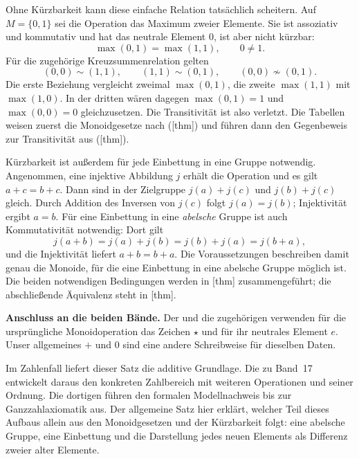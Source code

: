 Ohne Kürzbarkeit kann diese einfache Relation tatsächlich
scheitern. Auf \(M=\{0,1\}\) sei die Operation das Maximum
zweier Elemente. Sie ist assoziativ und kommutativ und hat
das neutrale Element \(0\), ist aber nicht kürzbar:
\[
  \max(0,1)=\max(1,1),\qquad 0\ne1.
\]
Für die zugehörige Kreuzsummenrelation gelten
\[
  (0,0)\sim(1,1),\qquad (1,1)\sim(0,1),
  \qquad (0,0)\not\sim(0,1).
\]
Die erste Beziehung vergleicht zweimal \(\max(0,1)\), die
zweite \(\max(1,1)\) mit \(\max(1,0)\). In der dritten
wären dagegen \(\max(0,1)=1\) und \(\max(0,0)=0\)
gleichzusetzen. Die Transitivität ist also verletzt.
Die Tabellen weisen zuerst die Monoidgesetze nach
([thm]) und führen dann
den Gegenbeweis zur Transitivität aus
([thm]).

Kürzbarkeit ist außerdem für jede Einbettung in eine Gruppe
notwendig. Angenommen, eine injektive Abbildung \(j\) erhält
die Operation und es gilt \(a+c=b+c\). Dann sind in der
Zielgruppe \(j(a)+j(c)\) und \(j(b)+j(c)\) gleich.
Durch Addition des Inversen von \(j(c)\) folgt
\(j(a)=j(b)\); Injektivität ergibt \(a=b\).
Für eine Einbettung in eine \emph{abelsche} Gruppe ist auch
Kommutativität notwendig: Dort gilt
\[
  j(a+b)=j(a)+j(b)=j(b)+j(a)=j(b+a),
\]
und die Injektivität liefert \(a+b=b+a\).
Die Voraussetzungen beschreiben damit genau die Monoide,
für die eine Einbettung in eine abelsche Gruppe möglich ist.
Die beiden notwendigen Bedingungen werden in
[thm] zusammengeführt;
die abschließende Äquivalenz steht in
[thm].

\par{}
\medskip\noindent\textbf{Anschluss an die beiden Bände.}
Der \DifferencesMainLink{} und die zugehörigen
\DifferencesProofsLink{} verwenden für die ursprüngliche
Monoidoperation das Zeichen \(\star\) und für ihr neutrales
Element \(e\). Unser allgemeines \(+\) und \(0\) sind
eine andere Schreibweise für dieselben Daten.

Im Zahlenfall liefert dieser Satz die additive Grundlage.
Die \IntegersReadingLink{} zu Band~17 entwickelt daraus
den konkreten Zahlbereich mit weiteren Operationen und seiner
Ordnung. Die dortigen \IntegersProofsLink{} führen den
formalen Modellnachweis bis zur Ganzzahlaxiomatik aus.
Der allgemeine Satz hier erklärt, welcher Teil dieses Aufbaus
allein aus den Monoidgesetzen und der Kürzbarkeit folgt:
eine abelsche Gruppe, eine Einbettung und die Darstellung
jedes neuen Elements als Differenz zweier alter Elemente.
